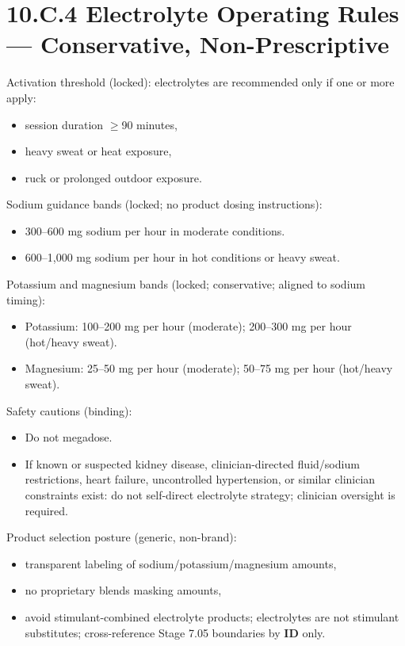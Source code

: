 \documentclass[10pt]{article}
\begin{document}
\section*{10.C.4 Electrolyte Operating Rules — Conservative, Non-Prescriptive}
{}

Activation threshold (locked): electrolytes are recommended only if one or more apply:

\begin{itemize}
\item session duration $\geq$90 minutes,
\item heavy sweat or heat exposure,
\item ruck or prolonged outdoor exposure.
\end{itemize}

Sodium guidance bands (locked; no product dosing instructions):

\begin{itemize}
\item 300–600 mg sodium per hour in moderate conditions.
\item 600–1,000 mg sodium per hour in hot conditions or heavy sweat.
\end{itemize}

Potassium and magnesium bands (locked; conservative; aligned to sodium timing):

\begin{itemize}
\item Potassium: 100–200 mg per hour (moderate); 200–300 mg per hour (hot/heavy sweat).
\item Magnesium: 25–50 mg per hour (moderate); 50–75 mg per hour (hot/heavy sweat).
\end{itemize}

Safety cautions (binding):
\begin{itemize}
\item Do not megadose.
\item If known or suspected kidney disease, clinician-directed fluid/sodium restrictions, heart failure, uncontrolled hypertension, or similar clinician constraints exist: do not self-direct electrolyte strategy; clinician oversight is required.
\end{itemize}

Product selection posture (generic, non-brand):

\begin{itemize}
\item transparent labeling of sodium/potassium/magnesium amounts,
\item no proprietary blends masking amounts,
\item avoid stimulant-combined electrolyte products; electrolytes are not stimulant substitutes; cross-reference Stage 7.05 boundaries by \textbf{ID} only.
\end{itemize}
\end{document}
